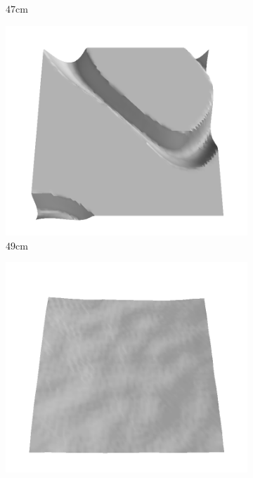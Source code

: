 \documentclass[../document.tex]{subfiles}
\begin{document}
\begin{figure}[htbp]
\begin{subfigure}[b]{0.19\textwidth}
    \caption{$47$cm}
    \end{subfigure}
    \begin{subfigure}[b]{0.19\textwidth}
    \includegraphics[width=\linewidth]{../img/5/train/all/49-patch-3d-majavi-24.png}
    \caption{$49$cm}
    \end{subfigure}
    \begin{subfigure}[b]{0.19\textwidth}
    \includegraphics[width=\linewidth]{../img/5/train/all/51-patch-3d-majavi-25.png}

\end{subfigure}
\end{figure}
\end{document}
